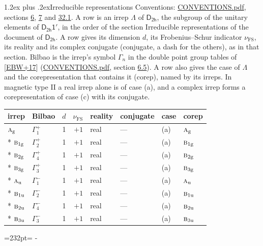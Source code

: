 \documentclass[10pt,a4paper]{article}
\makeatletter
\renewcommand\section{\@startsection{section}{1}{\z@}{-3ex plus -1ex minus -.2ex}%
  {1.2ex plus .2ex}{\normalfont\large\sffamily\bfseries\color{parttitle}}}
\newcommand{\needspace}[1]{\par\penalty-100\begingroup\dimen0=#1\relax\dimen2=\pagegoal
  \advance\dimen2-\pagetotal\ifdim\dimen0>\dimen2\relax\ifdim\dimen2>0pt\vfil\break\fi\fi
  \endgroup}
\numberwithin{equation}{section}
\newcommand{\grp}[1]{\mathsf{#1}}
\newcommand{\irr}[1]{\text{\normalfont\scshape #1}}
\newcommand{\ptag}[1]{\mathrm{#1}}
\newcommand{\fsind}{\nu_{\mathrm{FS}}}
\makeatother
\begin{document}
\section{Irreducible representations}\label{s:irreps}
Conventions: \href{../../CONVENTIONS.pdf}{CONVENTIONS.pdf}, sections \href{../../../rotation/CONVENTIONS.pdf\#conv.6}{6}, \href{../../../rotation/CONVENTIONS.pdf\#conv.7}{7} and \href{../../CONVENTIONS.pdf\#conv.32.1}{32.1}.
\leavevmode\label{n:irrep.Delta}A row is an irrep $\Lambda$ of $\grp{D_{2h}}$, the subgroup of the unitary elements of $\grp{D_{2h}1'}$, in the order of the section Irreducible representations of the document of \href{../../../rotation/data/pdf/D2h.pdf}{$\grp{D_{2h}}$}. \label{n:index.dimension}\label{n:index.frobenius}\label{n:head.irrep}\label{n:head.reality}\label{n:head.conjugate}A row gives its dimension $d$, its Frobenius--Schur indicator $\fsind$, its reality and its complex conjugate (conjugate, a dash for the others), as in that section. \label{n:head.bilbao}\label{n:irrep.alias.gamma}Bilbao is the irrep's symbol $\Gamma_n$ in the double point group tables of [\href{../../../REFERENCES.pdf\#ref.EBW+17}{EBW+17}] (\href{../../CONVENTIONS.pdf}{CONVENTIONS.pdf}, section \href{../../../rotation/CONVENTIONS.pdf\#conv.6.5}{6.5}). \label{n:head.case.corep}\label{n:head.corep}A row also gives the case of $\Lambda$ and the corepresentation that contains it (corep), named by its irreps. In magnetic type II a real irrep alone is of case (a), and a complex irrep forms a corepresentation of case (c) with its conjugate.
\setlength{\emergencystretch}{2em}\par\setlength{\emergencystretch}{0pt}
{\small\renewcommand{\arraystretch}{1.25}\setlength{\tabcolsep}{4pt}\begin{longtable}{@{}llrrllll@{}}\toprule
irrep & Bilbao & $d$ & $\fsind$ & reality & conjugate & case & corep\\\midrule\endhead
\bottomrule\endfoot\endlastfoot
$\irr{a}_{\ptag{g}}$ & $\Gamma_{1}^{+}$ & 1 & $+1$ & real & --- & (a) & $\irr{a}_{\ptag{g}}$\\*
$\irr{b}_{1\ptag{g}}$ & $\Gamma_{2}^{+}$ & 1 & $+1$ & real & --- & (a) & $\irr{b}_{1\ptag{g}}$\\*
$\irr{b}_{2\ptag{g}}$ & $\Gamma_{4}^{+}$ & 1 & $+1$ & real & --- & (a) & $\irr{b}_{2\ptag{g}}$\\*
$\irr{b}_{3\ptag{g}}$ & $\Gamma_{3}^{+}$ & 1 & $+1$ & real & --- & (a) & $\irr{b}_{3\ptag{g}}$\\*
$\irr{a}_{\ptag{u}}$ & $\Gamma_{1}^{-}$ & 1 & $+1$ & real & --- & (a) & $\irr{a}_{\ptag{u}}$\\*
$\irr{b}_{1\ptag{u}}$ & $\Gamma_{2}^{-}$ & 1 & $+1$ & real & --- & (a) & $\irr{b}_{1\ptag{u}}$\\*
$\irr{b}_{2\ptag{u}}$ & $\Gamma_{4}^{-}$ & 1 & $+1$ & real & --- & (a) & $\irr{b}_{2\ptag{u}}$\\*
$\irr{b}_{3\ptag{u}}$ & $\Gamma_{3}^{-}$ & 1 & $+1$ & real & --- & (a) & $\irr{b}_{3\ptag{u}}$\\
\bottomrule\end{longtable}}
\needspace{232pt}
\end{document}
